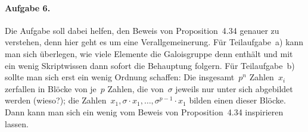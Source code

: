 \documentclass{../algblatt}
\begin{document}
\paragraph{Aufgabe 6.} Die Aufgabe soll dabei helfen, den Beweis von Proposition~4.34
genauer zu verstehen, denn hier geht es um eine Verallgemeinerung. Für
Teilaufgabe~a) kann man sich überlegen, wie viele Elemente die Galoisgruppe
denn enthält und mit ein wenig Skriptwissen dann sofort die Behauptung folgern.
Für Teilaufgabe~b) sollte man sich erst ein wenig Ordnung schaffen: Die
insgesamt~$p^n$ Zahlen~$x_i$ zerfallen in Blöcke von je~$p$ Zahlen, die
von~$\sigma$ jeweils nur unter sich abgebildet werden (wieso?); die
Zahlen~$x_1, \sigma \cdot x_1, \ldots, \sigma^{p-1} \cdot x_1$ bilden einen
dieser Blöcke. Dann kann man sich ein wenig vom Beweis von Proposition~4.34
inspirieren lassen.

\end{document}
